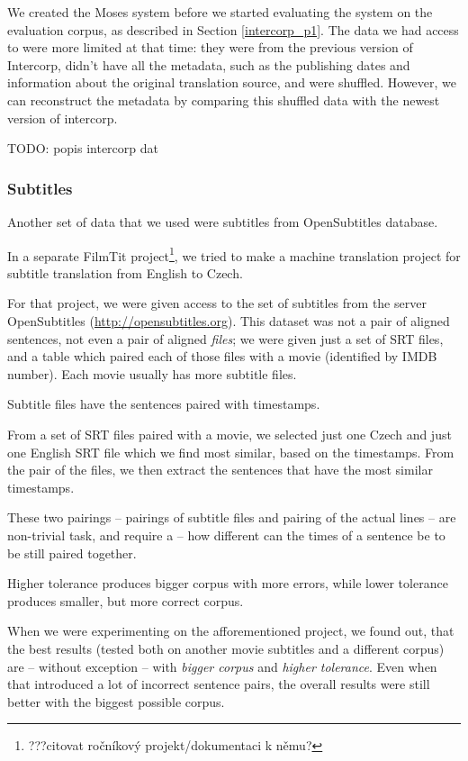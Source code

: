 We created the Moses system before we started evaluating the system on the evaluation corpus, as described in Section \ref{intercorp_p1}. 
The data we had access to were more limited at that time: they were from the previous version of Intercorp, didn't have all the metadata, such as the publishing dates and information about the original translation source, and were shuffled. However, we can reconstruct the metadata by comparing this shuffled data with the newest version of intercorp.


TODO: popis intercorp dat

\subsubsection{Subtitles}
Another set of data that we used were subtitles from OpenSubtitles database.

In a separate FilmTit project\footnote{???citovat ročníkový projekt/dokumentaci k němu?}, we tried to make a machine translation project for subtitle translation from English to Czech.

For that project, we were given access to the set of subtitles from the server OpenSubtitles (\url{http://opensubtitles.org}). This dataset was not a pair of aligned sentences, not even a pair of aligned \emph{files}; we were given just a set of SRT files, and a table which paired each of those files with a movie (identified by IMDB number). Each movie usually has more subtitle files.

Subtitle files have the sentences paired with timestamps.

From a set of SRT files paired with a movie, we selected just one Czech and just one English SRT file which we find most similar, based on the timestamps.
From the pair of the files, we then extract the sentences that have the most similar timestamps.

These two pairings -- pairings of subtitle files and pairing of the actual lines -- are non-trivial task, and require a  -- how different can the times of a sentence be to be still paired together.

Higher tolerance produces bigger corpus with more errors, while lower tolerance produces smaller, but more correct corpus.

When we were experimenting on the afforementioned project, we found out, that the best results (tested both on another movie subtitles and a different corpus) are -- without exception -- with \emph{bigger corpus} and \emph{higher tolerance}. Even when that introduced a lot of incorrect sentence pairs, the overall results were still better with the biggest possible corpus.

